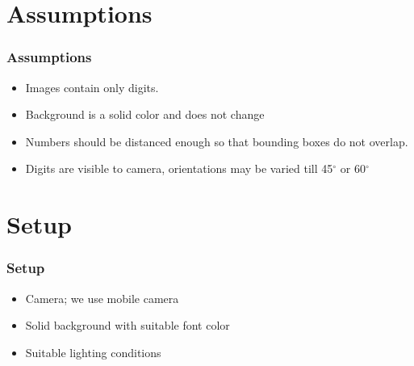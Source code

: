 \documentclass[11.5pt,aspectratio=1610,xcolor={usenames,dvipsnames,table}]{beamer}
\begin{document}
\section{Assumptions}
\begin{frame}
\frametitle{Assumptions}
\begin{itemize}
	\item Images contain only digits.
	\item Background is a solid color and does not change
	\item Numbers should be distanced enough so that bounding boxes do not overlap.
	\item Digits are visible to camera, orientations may be varied till 45$^{\circ}$ or 60$^{\circ}$ 

\end{itemize}
\end{frame}

\section{Setup}

\begin{frame}
\frametitle{Setup}
	\begin{itemize}
		\item Camera; we use mobile camera
		\item Solid background with suitable font color 
		\item Suitable lighting conditions
	\end{itemize}



\end{frame}
\end{document}

